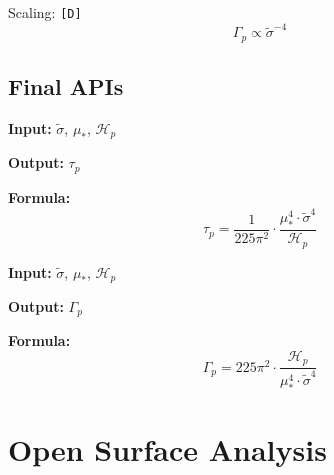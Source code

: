 \documentclass[11pt,a4paper]{article}
\newcommand{\tagD}{\textcolor{green!50!black}{\texttt{[D]}}}
\theoremstyle{definition}
\begin{document}
Scaling: \tagD{}
\begin{equation}
\label{eq:rate-scaling}
\Gamma_p \propto \tilde{\sigma}^{-4}
\end{equation}

\subsection{Final APIs}
\label{subsec:final-apis}

\begin{apibox}
\textbf{Input:} $\tilde{\sigma}$, $\mu_*$, $\mathcal{H}_p$

\textbf{Output:} $\tau_p$

\textbf{Formula:}
\begin{equation}
\label{eq:api-tau3}
\tau_p = \frac{1}{225\pi^2} \cdot \frac{\mu_*^4 \cdot \tilde{\sigma}^4}{\mathcal{H}_p}
\end{equation}
\end{apibox}

\begin{apibox}
\textbf{Input:} $\tilde{\sigma}$, $\mu_*$, $\mathcal{H}_p$

\textbf{Output:} $\Gamma_p$

\textbf{Formula:}
\begin{equation}
\label{eq:api-gamma1}
\Gamma_p = 225\pi^2 \cdot \frac{\mathcal{H}_p}{\mu_*^4 \cdot \tilde{\sigma}^4}
\end{equation}
\end{apibox}

\section{Open Surface Analysis}
\label{sec:open-surface}
\end{document}
